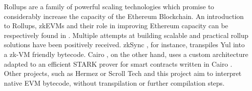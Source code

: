 Rollups are a family of powerful scaling technologies which promise to considerably increase the capacity of the Ethereum Blockchain. An introduction to Rollups, zkEVMs and their role in improving Ethereum capacity can be respectively found in \cite{vitalik_rollup_2021, mediumZKEVM}. Multiple attempts at building scalable and practical rollup solutions have been positively received. zkSync \cite{zksync}, for instance, transpiles Yul into a zk-VM friendly bytecode. Cairo \cite{cairo}, on the other hand, uses a custom architecture adapted to an efficient STARK prover for smart contracts written in Cairo . Other projects, such as Hermez \cite{hermez} or Scroll Tech \cite{scroll} and this project aim to interpret native EVM bytecode, without transpilation or further compilation steps.